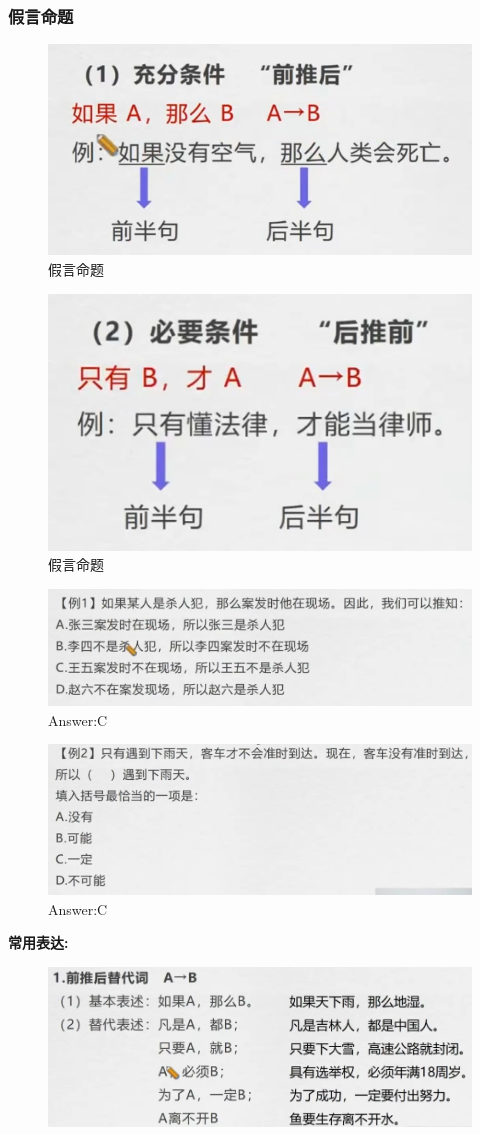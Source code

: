 \documentclass{article}
\numberwithin{equation}{section}						%
\numberwithin{figure}{section}							%
\begin{document}
\begin{sloppypar}
\subsubsection{假言命题}


\begin{figure}[H]
     \centering
     \includegraphics[width=0.4\linewidth]{148.png}
	\caption{假言命题}
\end{figure}



\begin{figure}[H]
     \centering
     \includegraphics[width=0.4\linewidth]{149.png}
	\caption{假言命题}
\end{figure}


\begin{figure}[H]
     \centering
     \includegraphics[width=0.6\linewidth]{150.png}
	\caption{Answer:C}
\end{figure}



\begin{figure}[H]
     \centering
     \includegraphics[width=0.6\linewidth]{151.png}
	\caption{Answer:C}
\end{figure}


\textbf{常用表达:}

\begin{figure}[H]
     \centering
     \includegraphics[width=0.6\linewidth]{152.png}
\end{figure}



\end{sloppypar}
\end{document}
